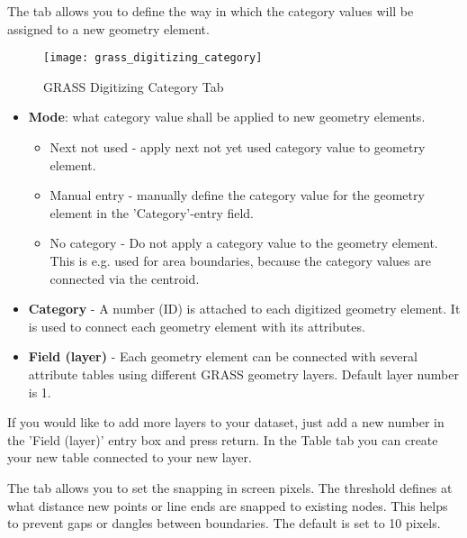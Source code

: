 
The  tab allows you to define the way in which the category
values will be assigned to a new geometry element.

\begin{figure}[h]
 \centering
  \texttt{[image: grass\_digitizing\_category]}
  \caption{GRASS Digitizing Category Tab \nixcaption}\label{fig:grass_digitizing_category}
 \end{figure}

\begin{itemize}[label=--]
\item \textbf{Mode}: what category value shall be applied to new geometry
elements.
\begin{itemize}[label=--]
\item Next not used - apply next not yet used category value to geometry
element.
\item Manual entry - manually define the category value for the geometry
element in the 'Category'-entry field.
\item No category - Do not apply a category value to the geometry element.
This is e.g. used for area boundaries, because the category values are
connected via the centroid.
\end{itemize}
\item \textbf{Category} - A number (ID) is attached to each digitized geometry
element. It is used to connect each geometry element with its attributes.
\item \textbf{Field (layer)} - Each geometry element can be connected with
several attribute tables using different GRASS geometry layers. Default layer
number is 1.
\end{itemize}

\begin{Tip}\caption{\textsc{Creating an additional GRASS 'layer' with QGIS}}
If you would like to add more layers to your dataset, just add a new
number in the 'Field (layer)' entry box and press return. In the Table tab
you can create your new table connected to your new layer.
\end{Tip}

\label{label_settingtab}

The  tab allows you to set the snapping in screen pixels. The
threshold defines at what distance new points or line ends are snapped to
existing nodes. This helps to prevent gaps or dangles between boundaries. The
default is set to 10 pixels.

